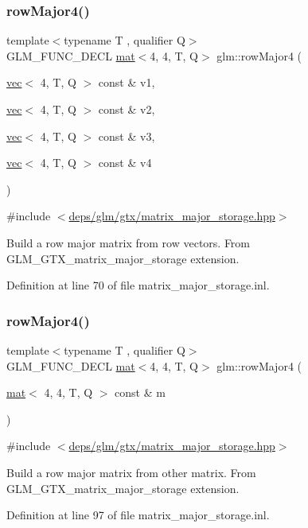 \subsubsection{\texorpdfstring{row\+Major4()}{rowMajor4()}\hspace{0.1cm}{\footnotesize\ttfamily [1/2]}}
{\footnotesize\ttfamily template$<$typename T , qualifier Q$>$ \\
G\+L\+M\+\_\+\+F\+U\+N\+C\+\_\+\+D\+E\+CL \hyperlink{structglm_1_1mat}{mat}$<$4, 4, T, Q$>$ glm\+::row\+Major4 (\begin{DoxyParamCaption}\item[{\hyperlink{structglm_1_1vec}{vec}$<$ 4, T, Q $>$ const \&}]{v1,  }\item[{\hyperlink{structglm_1_1vec}{vec}$<$ 4, T, Q $>$ const \&}]{v2,  }\item[{\hyperlink{structglm_1_1vec}{vec}$<$ 4, T, Q $>$ const \&}]{v3,  }\item[{\hyperlink{structglm_1_1vec}{vec}$<$ 4, T, Q $>$ const \&}]{v4 }\end{DoxyParamCaption})}



{\ttfamily \#include $<$\hyperlink{matrix__major__storage_8hpp}{deps/glm/gtx/matrix\+\_\+major\+\_\+storage.\+hpp}$>$}

Build a row major matrix from row vectors. From G\+L\+M\+\_\+\+G\+T\+X\+\_\+matrix\+\_\+major\+\_\+storage extension. 

Definition at line 70 of file matrix\+\_\+major\+\_\+storage.\+inl.

\mbox{\label{group__gtx__matrix__major__storage_gac92ad1c2acdf18d3eb7be45a32f9566b}} 
\subsubsection{\texorpdfstring{row\+Major4()}{rowMajor4()}\hspace{0.1cm}{\footnotesize\ttfamily [2/2]}}
{\footnotesize\ttfamily template$<$typename T , qualifier Q$>$ \\
G\+L\+M\+\_\+\+F\+U\+N\+C\+\_\+\+D\+E\+CL \hyperlink{structglm_1_1mat}{mat}$<$4, 4, T, Q$>$ glm\+::row\+Major4 (\begin{DoxyParamCaption}\item[{\hyperlink{structglm_1_1mat}{mat}$<$ 4, 4, T, Q $>$ const \&}]{m }\end{DoxyParamCaption})}



{\ttfamily \#include $<$\hyperlink{matrix__major__storage_8hpp}{deps/glm/gtx/matrix\+\_\+major\+\_\+storage.\+hpp}$>$}

Build a row major matrix from other matrix. From G\+L\+M\+\_\+\+G\+T\+X\+\_\+matrix\+\_\+major\+\_\+storage extension. 

Definition at line 97 of file matrix\+\_\+major\+\_\+storage.\+inl.

